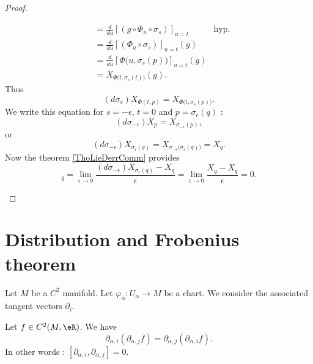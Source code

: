 \begin{proof}
\begin{subproof}
\begin{subequations}
\begin{align}
				                                      & =\frac{d}{du} \left[ (g\circ\Phi_u\circ\sigma_s)  \right]_{u=t}            & \text{hyp.} \\
				                                      & =\frac{d}{du} \left[ (\Phi_u\circ\sigma_s)  \right]_{u=t}(g)                             \\
				                                      & =\frac{d}{du} \left[ \Phi\big( u,\sigma_s(p) \big)  \right]_{u=t}(g)                     \\
				                                      & =X_{\Phi\big( t,\sigma_s(t) \big)}(g).
			\end{align}
		\end{subequations}
		Thus
		\begin{equation}
			(d\sigma_s)X_{\Phi(t,p)}=X_{\Phi\big( t,\sigma_s(p) \big)}.
		\end{equation}
		We write this equation for \( s=-\epsilon\), \( t=0\) and \( p=\sigma_{\epsilon}(q)\) :
		\begin{equation}
			(d\sigma_{-\epsilon})X_p=X_{\sigma_{-\epsilon}(p)},
		\end{equation}
		or
		\begin{equation}
			(d\sigma_{-\epsilon})X_{\sigma_{\epsilon}(q)}=X_{\sigma_{-\epsilon}\big( \sigma_{\epsilon}(q) \big)}=X_q.
		\end{equation}
		Now the theorem \ref{ThoLieDerrComm} provides
		\begin{equation}
			[Y,X]_q=\lim_{\epsilon\to 0}\frac{ (d\sigma_{-\epsilon})X_{\sigma_{\epsilon}(q)}-X_q }{ \epsilon }=\lim_{\epsilon\to 0}\frac{ X_q-X_q }{ \epsilon }=0.
		\end{equation}
	\end{subproof}
\end{proof}


\section{Distribution and Frobenius theorem}

\begin{lemma}	\label{LEMooGTUCooYXyGvv}
	Let \( M\) be a \( C^2\) manifold. Let \(\varphi_{\alpha} \colon U_{\alpha}\to M  \) be a chart. We consider the associated tangent vectors \( \partial_i\).

	Let \( f\in C^2(M,\eR)\). We have
	\begin{equation}
		\partial_{\alpha,i}(\partial_{\alpha,j}f)=\partial_{\alpha,j}(\partial_{\alpha,i}f).
	\end{equation}
	In other words : \( [\partial_{\alpha,i},\partial_{\alpha,j}]=0\).
\end{lemma}

